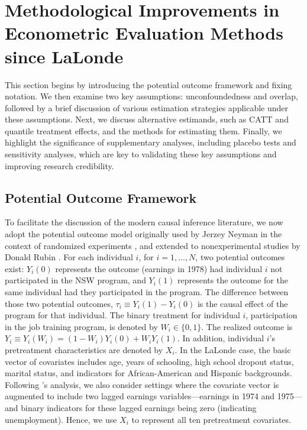 \documentclass[letterpaper,12pt,leqno]{article}
\begin{document}
\section{Methodological Improvements in Econometric Evaluation Methods since LaLonde}\label{s:graphs}

This section begins by introducing the potential outcome framework and fixing notation. We then examine two key assumptions: unconfoundedness and overlap, followed by a brief discussion of various estimation strategies applicable under these assumptions. Next, we discuss alternative estimands, such as CATT and quantile treatment effects, and the methods for estimating them. Finally, we highlight the significance of supplementary analyses, including placebo tests and sensitivity analyses, which are key to validating these key assumptions and improving research credibility.


\subsection{Potential Outcome Framework}

To facilitate the discussion of the modern causal inference literature, we now adopt the potential outcome model originally used by Jerzey Neyman in the context of randomized experiments \citep{neyman1923}, and extended to nonexperimental studies by Donald Rubin \citep{rubin1974estimating}.  For each individual $i$, for $i=1,\ldots,N$, two potential outcomes exist: $Y_i(0)$ represents the outcome (earnings in 1978) had individual $i$ not participated in the NSW program, and $Y_i(1)$ represents the outcome for the same individual had they participated in the program. The difference between those two potential outcomes, $\tau_{i} \equiv Y_i(1)-Y_i(0)$ is the causal effect of the program for that individual. The binary treatment for individual $i$, participation in the job training program, is denoted by $W_i\in\{0,1\}$. The realized outcome is $Y_i\equiv Y_i(W_i)=(1-W_i)Y_i(0)+W_iY_i(1)$. In addition, individual $i$'s pretreatment characteristics are denoted by $X_i$.  In the LaLonde case, the basic vector of covariates includes age, years of schooling, high school dropout status, marital status, and indicators for African-American and Hispanic backgrounds. Following \citet{dehejiawahba}'s analysis, we also consider settings where the covariate vector is augmented to include two lagged earnings variables---earnings in 1974 and 1975---and binary indicators for these lagged earnings being zero (indicating unemployment). Hence, we use $X_i$ to represent all ten pretreatment covariates.
\end{document}
